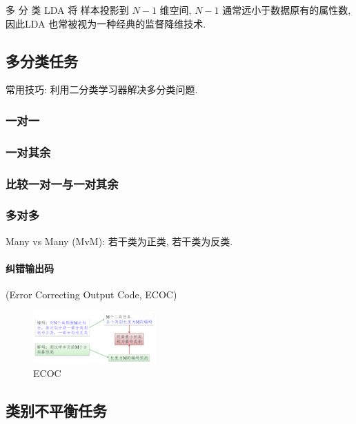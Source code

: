 多 分 类 LDA 将 样本投影到 $N - 1$ 维空间, $N - 1$ 通常远小于数据原有的属性数, 因此LDA 也常被视为一种经典的监督降维技术.



\subsection{多分类任务}
常用技巧: 利用二分类学习器解决多分类问题. 

\subsubsection{一对一}

\subsubsection{一对其余}

\subsubsection{比较一对一与一对其余}

\subsubsection{多对多}
Many vs Many (MvM): 若干类为正类, 若干类为反类. 

\paragraph{纠错输出码} (Error Correcting Output Code, ECOC)

\begin{figure}[!htb]
    \centering
    \includegraphics[width=0.42\textwidth]{pic/ML3/ECOC}
    \caption{ECOC}
\end{figure}



\subsection{类别不平衡任务}

